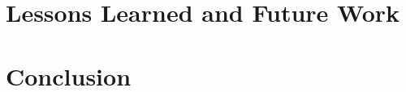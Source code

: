\documentclass{ucbthesis}
\begin{document}
\pagestyle{headings}










\chapter{Lessons Learned and Future Work}
\chapter{Conclusion}


\printbibliography
\end{document}
